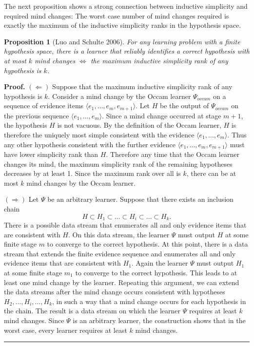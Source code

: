 \documentclass{elsarticle}%
\newtheorem{proposition}[theorem]{Proposition}
\renewenvironment{proof}[1][Proof]{\noindent\textbf{#1.} }{\ \rule{0.5em}{0.5em}}
\newcommand{\learnera}{\Psi}
\newcommand{\occam}{\learnera_{\mathit{occam}}}
\newcommand{\hypothesis}{H}
\begin{document}
The next proposition shows a strong connection between inductive simplicity and required mind changes: The worst case number of mind changes required is exactly the maximum of the inductive simplicity ranks in the hypothesis space. 

\begin{proposition}[Luo and Schulte 2006] \label{prop:mc-char}
For any learning problem with a finite hypothesis space, there is a learner that reliably identifies a correct hypothesis with at most $k$ mind changes $\iff$ the maximum inductive simplicity rank of any hypothesis is $k$.
\end{proposition}

\begin{proof}
$(\Leftarrow)$ Suppose that the maximum inductive simplicity rank of any hypothesis is $k$. Consider a mind change by the Occam learner $\occam$ on a sequence of evidence items $\langle e_{1},\ldots,e_{m},e_{m+1}\rangle$. Let $\hypothesis$ be the output of $\occam$ on the previous sequence  $\langle e_{1},\ldots,e_{m}\rangle$. Since a mind change occurred at stage $m+1$, the hypothesis $\hypothesis$ is not vacuous. By the definition of the Occam learner, $\hypothesis$ is therefore the uniquely most simple consistent with the evidence $\langle e_{1},\ldots,e_{m}\rangle$. Thus any other hypothesis consistent with the further evidence $\langle e_{1},\ldots,e_{m},e_{m+1}\rangle$ must have lower simplicity rank than $\hypothesis$. Therefore any time that the Occam learner changes its mind, the maximum simplicity rank of the remaining hypotheses decreases by at least 1. Since the maximum rank over all is $k$, there can be at most $k$ mind changes by the Occam learner.

$(\Rightarrow)$ Let $\learnera$ be an arbitrary learner. Suppose that there exists an inclusion chain 
\[ 
\hypothesis \subset \hypothesis_1\subset
\dots\subset \hypothesis_i\subset \dots\subset \hypothesis_k.
\]
There is a possible data stream that enumerates all and only evidence items that are consistent with $\hypothesis$. On this data stream, the learner $\learnera$ must output $\hypothesis$ at some finite stage $m$ to converge to the correct hypothesis. At this point, there is a data stream that extends the finite evidence sequence and enumerates all and only evidence items that are consistent with $\hypothesis_{1}$. Again the learner $\learnera$ must output $\hypothesis_{1}$ at some finite stage $m_{1}$ to converge to the correct hypothesis. This leads to at least one mind change by the learner. Repeating this argument, we can extend the data streams after the mind change occurs consistent with hypotheses $\hypothesis_{2}, \ldots,\hypothesis_{i},\ldots,\hypothesis_k$, in such a way that a mind change occurs for each hypothesis in the chain. The result is a data stream on which the learner $\learnera$ requires at  least $k$ mind changes. Since $\learnera$ is an arbitrary learner, the construction shows that in the worst case, every learner requires at least $k$ mind changes.
\end{proof}
\end{document}
